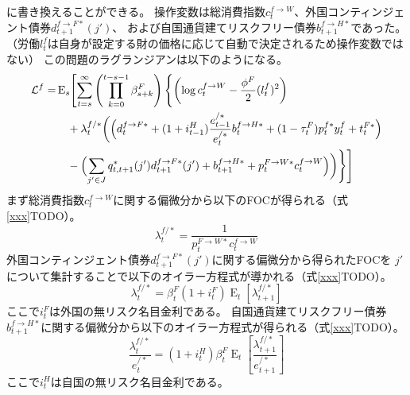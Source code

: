 に書き換えることができる。
操作変数は総消費指数\(c_t^{f\to W}\)、外国コンティンジェント債券\(d_{t+1}^{f\to F*}(j')\)、
および自国通貨建てリスクフリー債券\(b_{t+1}^{f\to H*}\)であった。
（労働\(l_t^f\)は自身が設定する財の価格に応じて自動で決定されるため操作変数ではない）
この問題のラグランジアンは以下のようになる。
\begin{equation}
\label{form:chapter3_households_stage2_foreign_lagrangian_eq}
    \begin{aligned}
        \mathcal{L}^f=&\operatorname{E}_s\Biggl[\sum_{t=s}^{\infty}\left(\prod_{k=0}^{t-s-1}\beta_{s+k}^F\right)\Biggl\{\left(\log c_t^{f\to W}-\frac{\phi^F}{2}(l_t^f)^2\right) \\
        &\quad+\lambda_t^{f/*}\biggl(\Bigl(d_t^{f\to F*}+(1+i_{t-1}^H)\frac{e_{t-1}^{/*}}{e_t^{/*}}b_t^{f\to H*}+(1-\tau_t^F)p_t^{f*}y_t^f+t_t^{F*}\Bigr) \\
        &\quad-\Bigl(\sum_{j'\in J}q_{t,t+1}^*(j')d_{t+1}^{f\to F*}(j')+b_{t+1}^{f\to H*}+p_t^{F\to W*}c_t^{f\to W}\Bigr)\biggr)\Biggr\}\Biggr]
    \end{aligned}
\end{equation}
まず総消費指数\(c_t^{f\to W}\)に関する偏微分から以下のFOCが得られる（式\eqref{xxx}TODO）。
\begin{equation}
\label{form:chapter3_households_stage2_foreign_lambda_f_slash_star_p_F_W_star_c_f_W_eq}
    \lambda_t^{f/*}=\frac{1}{p_t^{F\to W*}c_t^{f\to W}}
\end{equation}
外国コンティンジェント債券\(d_{t+1}^{f\to F*}(j')\)に関する偏微分から得られたFOCを
\(j'\)について集計することで以下のオイラー方程式が導かれる（式\eqref{xxx}TODO）。
\begin{equation}
\label{form:chapter3_households_stage2_foreign_lambda_f_slash_star_i_F_eq}
    \lambda_t^{f/*}=\beta_t^F(1+i_t^F)\operatorname{E}_t[\lambda_{t+1}^{f/*}]
\end{equation}
ここで\(i_t^F\)は外国の無リスク名目金利である。
自国通貨建てリスクフリー債券\(b_{t+1}^{f\to H*}\)に関する偏微分から以下のオイラー方程式が得られる（式\eqref{xxx}TODO）。
\begin{equation}
\label{form:chapter3_households_stage2_foreign_lambda_f_slash_star_i_H_eq}
    \frac{\lambda_t^{f/*}}{e_t^{/*}}=(1+i_t^H)\beta_t^F\operatorname{E}_t\left[\frac{\lambda_{t+1}^{f/*}}{e_{t+1}^{/*}}\right]
\end{equation}
ここで\(i_t^H\)は自国の無リスク名目金利である。